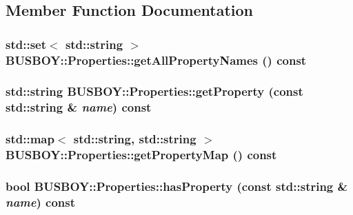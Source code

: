 \subsection{Member Function Documentation}
\hypertarget{classBUSBOY_1_1Properties_aec9ae610f9a2cdc964c70d30bf05f95b}{
\subsubsection[{getAllPropertyNames}]{\setlength{\rightskip}{0pt plus 5cm}std::set$<$ std::string $>$ BUSBOY::Properties::getAllPropertyNames () const}}
\label{classBUSBOY_1_1Properties_aec9ae610f9a2cdc964c70d30bf05f95b}
\hypertarget{classBUSBOY_1_1Properties_a7ab0d31f9dd2d5a4aa56f4bf4e1a49f8}{
\subsubsection[{getProperty}]{\setlength{\rightskip}{0pt plus 5cm}std::string BUSBOY::Properties::getProperty (const std::string \& {\em name}) const}}
\label{classBUSBOY_1_1Properties_a7ab0d31f9dd2d5a4aa56f4bf4e1a49f8}
\hypertarget{classBUSBOY_1_1Properties_a496e96e1883d04b29f4889c49f0446d9}{
\subsubsection[{getPropertyMap}]{\setlength{\rightskip}{0pt plus 5cm}std::map$<$ std::string, std::string $>$ BUSBOY::Properties::getPropertyMap () const}}
\label{classBUSBOY_1_1Properties_a496e96e1883d04b29f4889c49f0446d9}
\hypertarget{classBUSBOY_1_1Properties_a35e39730dcea4b741108903a5aa9e0da}{
\subsubsection[{hasProperty}]{\setlength{\rightskip}{0pt plus 5cm}bool BUSBOY::Properties::hasProperty (const std::string \& {\em name}) const}}
\label{classBUSBOY_1_1Properties_a35e39730dcea4b741108903a5aa9e0da}

